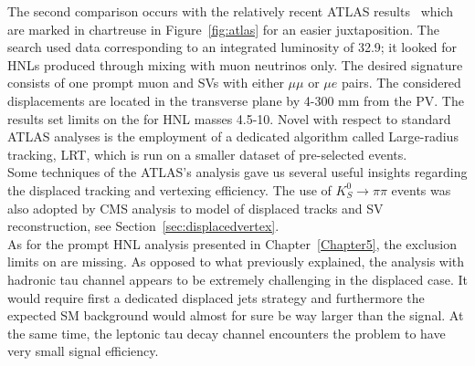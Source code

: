 The second comparison occurs with the relatively recent ATLAS
results~\cite{atlas_ll} which are marked in chartreuse in
Figure~\ref{fig:atlas} for an easier juxtaposition. The search used
data corresponding to an integrated
luminosity of 32.9\fbinv; it looked for HNLs produced through mixing with
muon neutrinos only. The desired signature consists of one prompt muon and SVs
with either $\mu \mu$ or $\mu e$ pairs. The considered displacements
are located in the transverse plane by 4-300 mm from the PV. The
results set limits on the \mixparm for HNL masses 4.5-10\GeV. Novel
with respect to standard ATLAS analyses is the employment of a
dedicated algorithm called Large-radius tracking, LRT, which is run on
a smaller dataset of pre-selected events.\\
Some techniques of the ATLAS's analysis gave us several useful
insights regarding the displaced tracking and vertexing
efficiency. The use of $K_S^{0} \rightarrow \pi \pi$ events was also
adopted by CMS analysis to model of displaced tracks
and SV reconstruction, see Section~\ref{sec:displacedvertex}.\\

As for the prompt HNL analysis presented in Chapter~\ref{Chapter5},
the exclusion limits on \mixpart are missing. As opposed to what
previously explained, the analysis with hadronic tau channel appears
to be extremely challenging in the displaced case. It would require
first a
dedicated displaced jets strategy and furthermore the expected SM background would almost
for sure be way larger than the signal.
At the same time, the leptonic tau decay channel encounters the
problem to have very small
signal efficiency.


\vspace{2cm}

